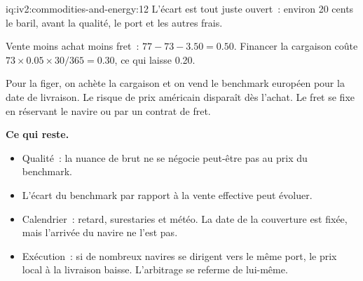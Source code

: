 \begin{solution}{iq:iv2:commodities-and-energy:12}
L'écart est tout juste ouvert~: environ 20 cents le baril, avant la qualité, le port et les autres frais.

Vente moins achat moins fret~: $77 - 73 - 3.50 = 0.50$. Financer la cargaison coûte $73 \times 0.05 \times 30/365 = 0.30$, ce qui laisse 0.20.

Pour la figer, on achète la cargaison et on vend le benchmark européen pour la date de livraison. Le risque de prix américain disparaît dès l'achat. Le fret se fixe en réservant le navire ou par un contrat de fret.

\textbf{Ce qui reste.}
\begin{itemize}
\item Qualité~: la nuance de brut ne se négocie peut-être pas au prix du benchmark.
\item L'écart du benchmark par rapport à la vente effective peut évoluer.
\item Calendrier~: retard, surestaries et météo. La date de la couverture est fixée, mais l'arrivée du navire ne l'est pas.
\item Exécution~: si de nombreux navires se dirigent vers le même port, le prix local à la livraison baisse. L'arbitrage se referme de lui-même.
\end{itemize}

\end{solution}

